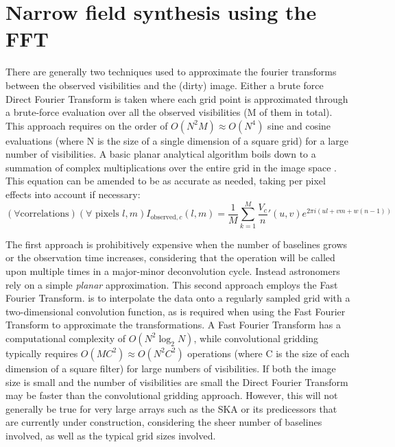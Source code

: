 \section{Narrow field synthesis using the FFT}
 There are generally two techniques used to approximate the fourier transforms between the observed visibilities and the (dirty) image. Either a brute force Direct Fourier Transform is taken where each grid point is approximated through a brute-force
 evaluation over all the observed visibilities (M of them in total). This approach requires on the order of $O(N^2M) \approx O(N^4)$ sine and cosine evaluations (where N is the size of a single dimension of a square grid) for a large number of visibilities. 
 A basic planar analytical algorithm boils down to a summation of complex multiplications over the entire grid in the image space \cite[Lecture 7]{taylor1999synthesis}. This equation can be amended to be as accurate as needed, taking per pixel effects into 
 account if necessary:
 \begin{equation}
  (\forall \text{correlations})(\forall\text{ pixels }l,m) I_{\text{observed},c}(l,m) = \frac{1}{M}\sum_{k=1}^{M}{\frac{V_{c}}{n}'(u,v)e^{2\pi i (ul + vm + w(n-1))}}
 \end{equation} 
 
 The first approach is prohibitively expensive when the number of baselines grows or the observation time increases, considering that the operation will be called upon multiple times in a major-minor deconvolution cycle. Instead astronomers rely
 on a simple \emph{planar} approximation. This second approach employs the Fast Fourier Transform. is to interpolate the data onto a regularly sampled grid with a two-dimensional convolution function, as is required when using the Fast Fourier Transform to approximate the transformations. A Fast Fourier Transform has a computational complexity of $O(N^2\log_2{N})$, while
 convolutional gridding typically requires $O(MC^2) \approx O(N^2C^2)$ operations (where C is the size of each dimension of a square filter) for large numbers of visibilities. If both the image size is small and the number of visibilities 
 are small the Direct Fourier Transform may be faster than the convolutional gridding approach. However, this will not generally be true for very large arrays such as the SKA or its predicessors that are currently under construction, 
 considering the sheer number of baselines involved, as well as the typical grid sizes involved.
 
